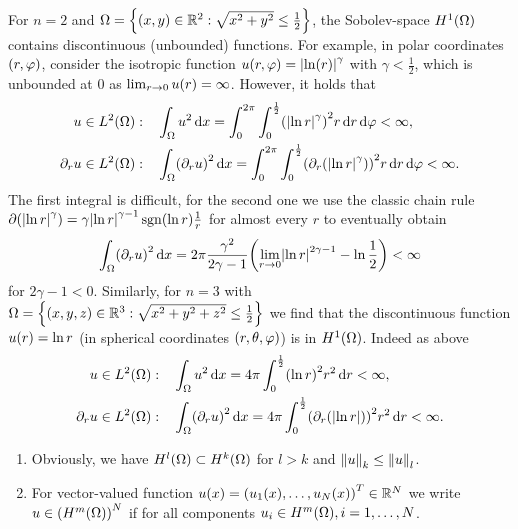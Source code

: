 \begin{example}
	For \(n = 2\) and \(\Omega = \braces*{\parentheses*{x, y} \in \R^2 : \sqrt{x^2 + y^2} \le \frac{1}{2}}\), the Sobolev-space \(H^1\parentheses*{\Omega}\) contains discontinuous (unbounded) functions.
	For example, in polar coordinates \(\parentheses*{r, \varphi}\), consider the isotropic function \(u\parentheses*{r, \varphi} = \absolute*{\ln\parentheses*{r}}^\gamma\) with \(\gamma < \frac{1}{2}\), which is unbounded at \(0\) as \(\lim_{r \to 0}u\parentheses*{r} = \infty\).
	However, it holds that
	\begin{align*}
		u \in L^2\parentheses*{\Omega}:& \quad \int_\Omega u^2 \d x = \int_0^{2\pi}\int_0^{\frac{1}{2}}\parentheses*{\absolute*{\ln r}^\gamma}^2 r\d r\d\varphi < \infty,\\
		\partial_r u \in L^2\parentheses*{\Omega}:& \quad \int_\Omega \parentheses*{\partial_r u}^2 \d x = \int_0^{2\pi}\int_0^{\frac{1}{2}}\parentheses*{\partial_r\parentheses*{\absolute*{\ln r}^\gamma}}^2 r\d r\d\varphi < \infty.
	\end{align*}
	The first integral is difficult, for the second one we use the classic chain rule \(\partial\parentheses*{\absolute*{\ln r}^\gamma} = \gamma\absolute*{\ln r}^{\gamma - 1}\sgn\parentheses*{\ln r}\frac{1}{r}\) for almost every \(r\) to eventually obtain
	\[
		\int_\Omega \parentheses*{\partial_r u}^2 \d x = 2\pi\frac{\gamma^2}{2\gamma - 1}\parentheses*{\lim_{r \to 0}\absolute*{\ln r}^{2\gamma - 1} - \ln\frac{1}{2}} < \infty
	\]
	for \(2\gamma - 1 < 0\).
	Similarly, for \(n = 3\) with \(\Omega = \braces*{\parentheses*{x, y, z} \in \R^3 : \sqrt{x^2 + y^2 + z^2} \le \frac{1}{2}}\) we find that the discontinuous function \(u\parentheses*{r} = \ln r\) (in spherical coordinates \(\parentheses*{r, \theta, \varphi}\)) is in \(H^1\parentheses*{\Omega}\).
	Indeed as above
	\begin{align*}
		u \in L^2\parentheses*{\Omega}:& \quad \int_\Omega u^2 \d x = 4\pi\int_0^{\frac{1}{2}}\parentheses*{\ln r}^2 r^2 \d r < \infty,\\
		\partial_r u \in L^2\parentheses*{\Omega}:& \quad \int_\Omega \parentheses*{\partial_r u}^2 \d x = 4\pi\int_0^{\frac{1}{2}}\parentheses*{\partial_r\parentheses*{\absolute*{\ln r}}}^2 r^2 \d r < \infty.
	\end{align*}
\end{example}

\begin{remark}
	\begin{enumerate}
		\item Obviously, we have \(H^l\parentheses*{\Omega} \subset H^k\parentheses*{\Omega}\) for \(l > k\) and \(\norm*{u}_k \le \norm*{u}_l\).
		\item For vector-valued function \(u\parentheses*{x} = \parentheses*{u_1\parentheses*{x}, \ldots, u_N\parentheses*{x}}^T \in \R^N\) we write \(u \in \parentheses*{H^m\parentheses*{\Omega}}^N\) if for all components \(u_i \in H^m\parentheses*{\Omega}, i = 1, \ldots, N\).
	\end{enumerate}
\end{remark}


